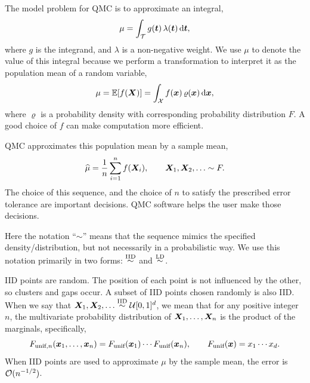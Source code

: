 \documentclass[graybox,footinfo]{svmult}
\newcommand{\hmu}{\widehat{\mu}}
\newcommand{\IID}{\textup{IID}}
\newcommand{\LD}{\textup{LD}}
\newcommand{\unif}{\textup{unif}}
\newcommand{\IIDsim}{\overset{\IID}{\sim}}
\newcommand{\LDsim}{\overset{\LD}{\sim}}
\begin{document}
The model problem for QMC is to approximate an integral,
\begin{equation} \label{eq:integral}
	\mu = \int_\calT g(\bst) \, \lambda(\bst) \, \D \bst,
\end{equation}
where $g$ is the integrand, and $\lambda$ is a non-negative weight.  We use $\mu$ to denote the value of this integral because we perform a transformation to interpret it as the population mean of a random variable, 
\begin{equation} \label{eq:fintegral}
	\mu = \bbE[f(\bsX)] = \int_\calX f(\bsx) \, \varrho(\bsx) \, \D \bsx,
\end{equation}
where $\varrho$ is a probability density with corresponding probability distribution $F$. 
A good choice of $f$ can make computation more efficient.

QMC approximates this population mean by a sample mean,
\begin{equation} \label{eq:samplemean}
	\hmu = \frac 1n \sum_{i=1}^n f(\bsX_i), \qquad \bsX_1, \bsX_2, \ldots \sim F.
\end{equation}
The choice of this sequence, and the choice of $n$ to satisfy  the prescribed error tolerance are important decisions.  QMC software helps the user make those decisions.

Here the notation ``$\sim$'' means that the sequence mimics the specified density/distribution, but not necessarily in a probabilistic way.  We  use this notation primarily  in two forms:  $\IIDsim$ and $\LDsim$.

IID points are random. The position of each point is not influenced by the other, so clusters and gaps occur.  A subset of IID points chosen randomly is also IID.  When we say that $\bsX_1, \bsX_2, \ldots \IIDsim \calU[0,1]^d$, we mean that for any positive integer $n$, the  multivariate probability distribution of ${\boldsymbol{X}}_1, \ldots, {\boldsymbol{X}}_n$ is the product of the marginals, specifically,
\begin{equation*}
	F_{\unif,n}(\bsx_1, \ldots, \bsx_n) = F_{\unif}(\bsx_1) \cdots  F_{\unif}(\bsx_n), \qquad F_{\unif}(\bsx) = x_1 \cdots x_d.
\end{equation*}
When IID points are used to approximate $\mu$ by the sample mean, the error is ${\mathcal{O}}(n^{-1/2})$.
\end{document}
